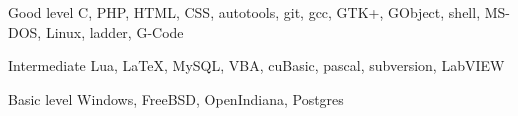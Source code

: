 \documentclass{tccv}
\begin{document}
\begin{CJK*}{UTF8}{bsmi}
\begin{factlist}

\item{Good level}
     {C, PHP, HTML, CSS, autotools, git, gcc, GTK+, GObject, shell,
      MS-DOS, Linux, ladder, G-Code}

\item{Intermediate}
     {Lua, \LaTeX, MySQL, VBA, cuBasic, pascal, subversion, LabVIEW}

\item{Basic level}
     {Windows, FreeBSD, OpenIndiana, Postgres}

\end{factlist}

\end{CJK*}
\end{document}
